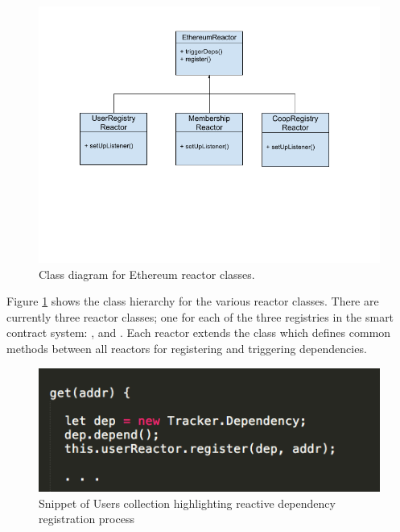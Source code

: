 \begin{figure}
\centering
\includegraphics[width=\textwidth]{Figures/ReactorsClassDiagram}
\decoRule
\caption[]{Class diagram for Ethereum reactor classes.}
\label{fig:ReactorsClassDiagram}
\end{figure}

Figure \ref{fig:ReactorsClassDiagram} shows the class hierarchy for the various reactor classes. There are currently three reactor classes; one for each of the three registries in the smart contract system: ,  and . Each reactor extends the  class which defines common methods between all reactors for registering and triggering dependencies. \\

\begin{figure}
\centering
\includegraphics[width=\textwidth]{Figures/UsersDepRegistration}
\decoRule
\caption[]{Snippet of Users collection highlighting reactive dependency registration process}
\label{fig:UsersDepRegistration}
\end{figure}

